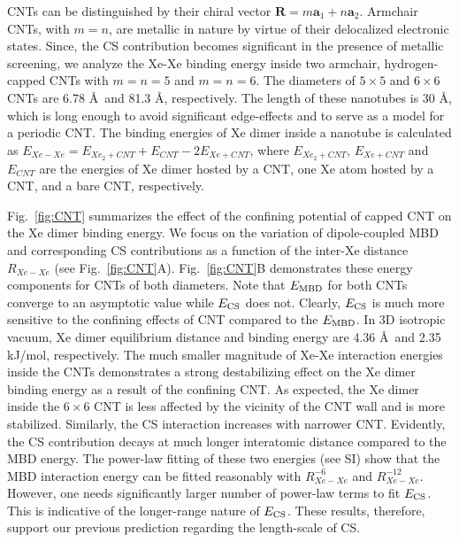 \documentclass[aps,prl,groupaddress, twocolumn]{revtex4-1}  %
\begin{document}
CNTs can be distinguished by their chiral vector $\mathbf{R}=m \mathbf{a}_1 +n \mathbf{a}_2 $. 
Armchair CNTs, with $m=n$, are metallic in nature by virtue of their delocalized electronic states. Since, the CS contribution becomes significant in the presence of metallic screening\cite{sadhukhan_prl_2017}, we analyze the Xe-Xe binding energy inside two armchair, hydrogen-capped CNTs with $m = n = 5$ and $m = n = 6$. The diameters of $5\times5$ and $6\times6$ CNTs are 6.78 \AA\ and 81.3 \AA, respectively. The length of these nanotubes is 30 \AA, which is long enough to avoid significant edge-effects and to serve as a model for a periodic CNT\@. The binding energies of Xe dimer inside a nanotube is calculated as $E_{Xe-Xe} = E_{Xe_2+CNT}+E_{CNT} - 2 E_{Xe+CNT}$, where $E_{Xe_2+CNT}$, $E_{Xe+CNT}$ and $E_{CNT}$ are the energies of Xe dimer hosted by a CNT, one Xe atom hosted by a CNT, and a bare CNT, respectively. 

Fig.~\ref{fig:CNT} summarizes the effect of the confining potential of capped CNT on the Xe dimer binding energy. We focus on the variation of dipole-coupled MBD and corresponding CS contributions as a function of the inter-Xe distance $R_{Xe-Xe}$ (see Fig.~\ref{fig:CNT}A). Fig.~\ref{fig:CNT}B demonstrates these energy components for CNTs of both diameters. Note that $E_{\rm MBD}$ for both CNTs converge to an asymptotic value while $E_{\rm CS}$ does not. Clearly, $E_{\rm CS}$ is much more sensitive to the confining effects of CNT compared to the $E_{\rm MBD}$. In 3D isotropic vacuum, Xe dimer equilibrium distance and binding energy are 4.36 \AA\ and 2.35 kJ/mol, respectively\cite{Jerabek_2017}. The much smaller magnitude of Xe-Xe interaction energies inside the CNTs demonstrates a strong destabilizing effect on the Xe dimer binding energy as a result of the confining CNT\@. As expected, the Xe dimer inside the $6\times6$ CNT is less affected by the vicinity of the CNT wall and is more stabilized. Similarly, the CS interaction increases with narrower CNT\@. Evidently, the CS contribution decays at much longer interatomic distance compared to the MBD energy. The power-law fitting of these two energies (see SI) show that the MBD interaction energy can be fitted reasonably with $R_{Xe-Xe}^{-6}$ and $R_{Xe-Xe}^{-12}$. However, one needs significantly larger number of power-law terms to fit $E_{\rm CS}$. This is indicative of the longer-range nature of $E_{\rm CS}$. These results, therefore, support our previous prediction regarding the length-scale of CS\cite{sadhukhan_prl_2017, sadhukhan_prl_reply2018}. 
\end{document}
